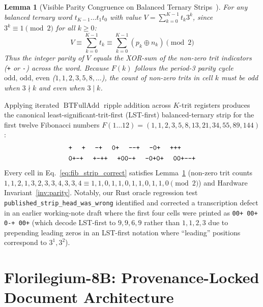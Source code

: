 \documentclass[10pt, twocolumn, a4paper]{article}
\newtheorem{lemma}{Lemma}
\begin{document}
\begin{lemma}[Visible Parity Congruence on Balanced Ternary Strips~\cite{flyxion2026loopclosing}]
\label{lem:visible_parity}
For any balanced ternary word $t_{K-1}\dots t_1 t_0$ with value $V = \sum_{k=0}^{K-1} t_k 3^k$, since $3^k \equiv 1 \pmod 2$ for all $k \ge 0$:
\begin{equation}
V \equiv \sum_{k=0}^{K-1} t_k \equiv \sum_{k=0}^{K-1} (p_k \oplus n_k) \pmod 2
\label{eq:visible_parity}
\end{equation}
Thus the integer parity of $V$ equals the XOR-sum of the non-zero trit indicators (\texttt{+} or \texttt{-}) across the word. Because $F(k)$ follows the period-3 parity cycle $\text{odd, odd, even}$ ($1, 1, 2, 3, 5, 8, \dots$), the count of non-zero trits in cell $k$ must be odd when $3 \nmid k$ and even when $3 \mid k$.
\end{lemma}

Applying iterated $\operatorname{BTFullAdd}$ ripple addition across $K$-trit registers produces the canonical least-significant-trit-first (LST-first) balanced-ternary strip for the first twelve Fibonacci numbers $F(1 \dots 12) = (1, 1, 2, 3, 5, 8, 13, 21, 34, 55, 89, 144)$:
\begin{equation}
\begin{split}
&\texttt{+ \; + \; -+ \; 0+ \; -{-}+ \; -0+ \; +++} \\
&\texttt{0+-+ \; +-++ \; +00-+ \; -0+0+ \; 00+-{-}+}
\end{split}
\label{eq:fib_strip_correct}
\end{equation}
Every cell in Eq.~\ref{eq:fib_strip_correct} satisfies Lemma~\ref{lem:visible_parity} (non-zero trit counts $1, 1, 2, 1, 3, 2, 3, 3, 4, 3, 3, 4 \equiv 1, 1, 0, 1, 1, 0, 1, 1, 0, 1, 1, 0 \pmod 2$) and Hardware Invariant~\ref{inv:parity}. Notably, our Rust oracle regression test \texttt{published\_strip\_head\_was\_wrong} identified and corrected a transcription defect in an earlier working-note draft where the first four cells were printed as \texttt{00+ 00+ 0-+ 00+} (which decode LST-first to $9, 9, 6, 9$ rather than $1, 1, 2, 3$ due to prepending leading zeros in an LST-first notation where ``leading'' positions correspond to $3^1, 3^2$).

\section{Florilegium-8B: Provenance-Locked Document Architecture}
\label{sec:florilegium}
\end{document}
